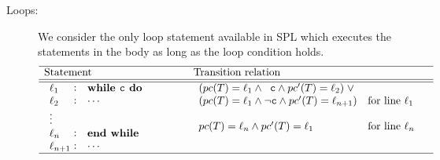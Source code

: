 \begin{description}
%
	\item [Loops:]
		We consider the only loop statement available in SPL which executes 
	the statements in the body as long as the loop condition holds.
%
		\[
				\begin{array}[t]{p{8em}@{\hspace{6em}}p{\longtablesize}}
				\hline
				Statement & Transition relation \\ \hline\hline
				$\begin{array}[t]{l@{\hspace{0.3em}}c@{\hspace{1em}}l}
					\ell_1 & : & \mathtt{\textbf{while } c \textbf{ do }} \\
					\ell_2 & : & \mathtt{\cdots} \\
					\mathtt{\vdots} \\
					\ell_n & : & \mathtt{\textbf{end while}} \\
					\ell_{n+1} & : & \mathtt{\cdots}
				\end{array}$
				&
				$\begin{array}[t]{ll}
						(\pc(T) = \ell_1 \andcond \;\;\texttt{c} \andcond \pc'(T) = \ell_2) \; 
						\Or \\
						(\pc(T) = \ell_1 \andcond \lnot \texttt{c} \andcond \pc'(T) = 
					\ell_{n+1})
					& \text{for line $\ell_1$} \\ \\
					\pc(T) = \ell_n \andcond \pc'(T) = \ell_1 &
						\text{for line $\ell_n$}
				 \end{array}$ \\ \hline

\end{array}\]
\end{description}
